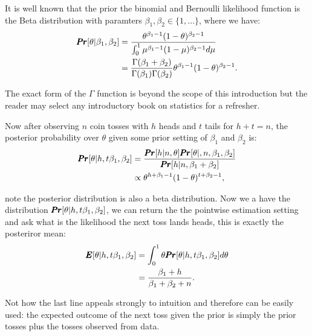 It is well known that the prior the binomial and Bernoulli likelihood function is the Beta distribution with paramters $\beta_1, \beta_2 \in \{1, \ldots \}$, where we have:
	\begin{align*}
		\pmb{Pr}[\theta | \beta_1, \beta_2 ] 
		&= \frac{\theta^{\beta_1 - 1} (1 - \theta)^{\beta_2 - 1}}{\int_{0}^1 \mu^{\beta_1 - 1} (1 - \mu)^{\beta_2 - 1} d \mu} \\
		&= \frac{\Gamma(\beta_1 + \beta_2)}{\Gamma(\beta_1)\Gamma(\beta_2)} \theta^{\beta_1 - 1} (1-\theta)^{\beta_2 - 1}.
	\end{align*}

The exact form of the $\Gamma$ function is beyond the scope of this introduction but the reader may select any introductory book on statistics for a refresher. 

Now after observing $n$ coin tosses with $h$ heads and $t$ tails for $h + t = n$, the posterior probability over $\theta$ given some prior setting of $\beta_1$ and $\beta_2$ is:
	\begin{align*}
		\pmb{Pr}[\theta | h, t\beta_1, \beta_2 ] 
		&= \frac{\pmb{Pr}[ h | n, \theta] \pmb{Pr}[\theta |, n, \beta_1, \beta_2]}{\pmb{Pr}[h|n, \beta_1 + \beta_2]} \\
		&\propto \theta^{h + \beta_1 - 1} (1 - \theta)^{t + \beta_2 - 1},
	\end{align*}

note the posterior distribution is also a beta distribution. Now we a have the distribution $\pmb{Pr}[\theta | h, t\beta_1, \beta_2 ]$, we can return the the pointwise estimation setting and ask what is the likelihood the next toss lands heads, this is exactly the posteriror mean:
	\begin{align*}
		\pmb{E}[\theta | h, t\beta_1, \beta_2 ]  
		&= \int_{0}^1 \theta \pmb{Pr}[\theta | h, t\beta_1, \beta_2 ] d \theta \\
		&= \frac{\beta_1 + h}{\beta_1 + \beta_2 + n}.
	\end{align*}

Not how the last line appeals strongly to intuition and therefore can be easily used: the expected outcome of the next toss given the prior is simply the prior tosses plus the tosses observed from data. 

